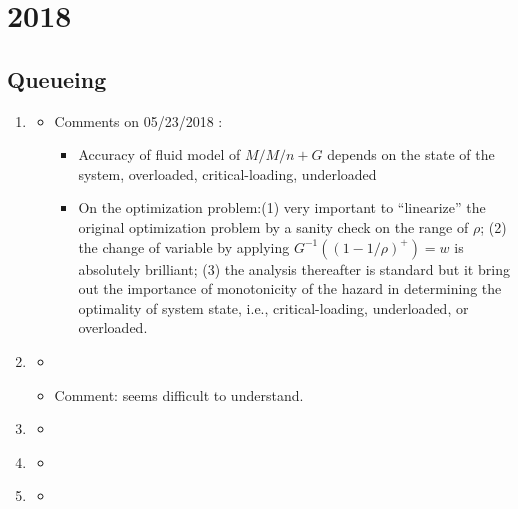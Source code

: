 \section{2018}
\subsection{Queueing}
\begin{enumerate}

\item \citet{bassamboo2010accuracy}
\begin{itemize}
\item Comments on 05/23/2018 :
\begin{itemize}
\item Accuracy of fluid model of $M/M/n+G$ depends on the state of the system, overloaded, critical-loading, underloaded
\item On the optimization problem:(1) very important to ``linearize'' the original optimization problem by a sanity check on the range of $\rho$; (2) the change of variable by applying $G^{-1}((1-1/\rho)^{+})=w$ is absolutely brilliant; (3) the analysis thereafter is standard but it bring out the importance of monotonicity of the hazard in determining the optimality of system state, i.e., critical-loading, underloaded, or overloaded.
\end{itemize}

\end{itemize}

\item \citet{zeltyn2005call}
\begin{itemize}
\item 
\item Comment: seems difficult to understand.
\end{itemize}


\item \citet{ward2005diffusion}
\begin{itemize}
    \item 
\end{itemize}

\item \citet{Halfin1981Heavy-TrafficServers.}
\begin{itemize}
    \item 
\end{itemize}

\item \citet{Whitt1999DynamicCalls}
\begin{itemize}
    \item 
\end{itemize}
\end{enumerate}

